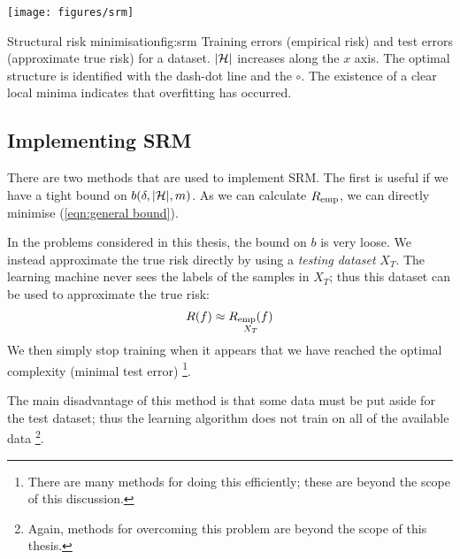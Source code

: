 \begin{linefigure}
\begin{center}
\texttt{[image: figures/srm]}
\end{center}
\begin{capt}{Structural risk minimisation}{fig:srm}
Training errors (empirical risk) and test errors (approximate true
risk) for a dataset.  $|\mathcal{H}|$ increases along the $x$ axis.
The optimal structure is identified with the dash-dot line and the
$\circ$.  The existence of a clear local minima indicates that
overfitting has occurred.
\end{capt}
\end{linefigure}


\subsection{Implementing SRM}

There are two methods that are used to implement SRM.  The first
is useful if we have a tight bound on $b(\delta, |\mathcal{H}|, m)$.  As we
can calculate $R_{\mathrm{emp}}$, we can directly minimise (\ref{eqn:general
bound}).

In the problems considered in this thesis, the bound on $b$ is very
loose.  We instead approximate the true risk directly by using a
\emph{testing dataset} $X_T$.  The learning machine never sees the
labels of the samples in $X_T$; thus this dataset can be used to
approximate the true risk:
%
\begin{equation}
R(f) \approx \underset{X_T}{R_{\mathrm{emp}}(f)}
\end{equation}
%
We then simply stop training when it appears that we have reached the
optimal complexity (minimal test error)%
\footnote{There are many methods for doing this efficiently;
these are beyond the scope of this discussion.}.

The main disadvantage of this method is that some data must be put
aside for the test dataset; thus the learning algorithm does not train
on all of the available data%
\footnote{Again, methods for overcoming this problem are beyond the
scope of this thesis.}.

